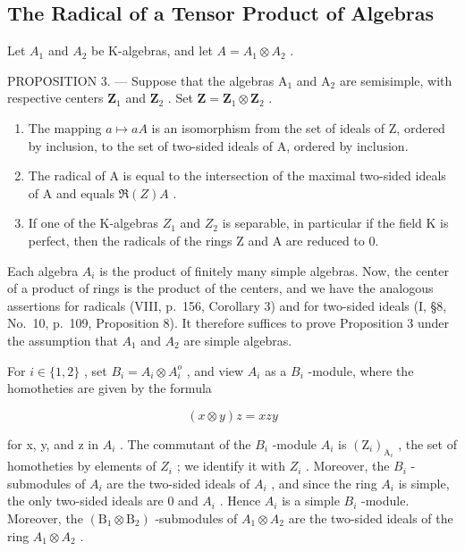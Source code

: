 \subsection{The Radical of a Tensor Product of Algebras}

Let \(A_{1}\) and \(A_{2}\) be K-algebras, and let \(A = A_{1} \otimes A_{2}\) .

PROPOSITION 3. --- Suppose that the algebras \(\mathrm{A}_1\) and \(\mathrm{A}_2\) are semisimple, with respective centers \(\mathbf{Z}_1\) and \(\mathbf{Z}_2\) . Set \(\mathbf{Z} = \mathbf{Z}_1 \otimes \mathbf{Z}_2\) .

\begin{enumerate}
\def\labelenumi{\alph{enumi})}
\item
  The mapping \(a \mapsto aA\) is an isomorphism from the set of ideals of Z, ordered by inclusion, to the set of two-sided ideals of A, ordered by inclusion.
\item
  The radical of A is equal to the intersection of the maximal two-sided ideals of A and equals \(\Re(Z)A\) .
\item
  If one of the K-algebras \(Z_{1}\) and \(Z_{2}\) is separable, in particular if the field K is perfect, then the radicals of the rings Z and A are reduced to 0.
\end{enumerate}

Each algebra \(A_{i}\) is the product of finitely many simple algebras. Now, the center of a product of rings is the product of the centers, and we have the analogous assertions for radicals (VIII, p.~156, Corollary 3) and for two-sided ideals (I, §8, No.~10, p.~109, Proposition 8). It therefore suffices to prove Proposition 3 under the assumption that \(A_{1}\) and \(A_{2}\) are simple algebras.

For \(i \in \{1,2\}\) , set \(B_i = A_i \otimes A_i^o\) , and view \(A_i\) as a \(B_i\) -module, where the homotheties are given by the formula

\[
(x \otimes y) z = x z y
\]

for x, y, and z in \(A_{i}\) . The commutant of the \(B_{i}\) -module \(A_{i}\) is \((\mathrm{Z}_{i})_{\mathrm{A}_{i}}\) , the set of homotheties by elements of \(Z_{i}\) ; we identify it with \(Z_{i}\) . Moreover, the \(B_{i}\) -submodules of \(A_{i}\) are the two-sided ideals of \(A_{i}\) , and since the ring \(A_{i}\) is simple, the only two-sided ideals are 0 and \(A_{i}\) . Hence \(A_{i}\) is a simple \(B_{i}\) -module. Moreover, the \((\mathrm{B}_{1}\otimes\mathrm{B}_{2})\) -submodules of \(A_{1}\otimes A_{2}\) are the two-sided ideals of the ring \(A_{1}\otimes A_{2}\) .

